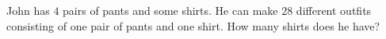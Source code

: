 John has $4$ pairs of pants and some shirts. He can make $28$ different outfits consisting of one pair of pants and one shirt. How many shirts does he have?
